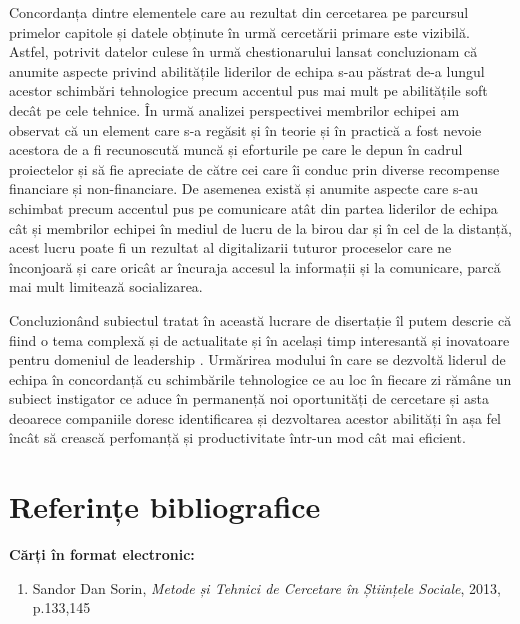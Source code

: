 \documentclass[a4paper, 12pt]{article}
\begin{document}
	\quad  Concordanța dintre elementele care au rezultat din cercetarea pe parcursul primelor capitole și datele obținute în urmă cercetării primare este vizibilă. Astfel, potrivit datelor culese în urmă chestionarului lansat concluzionam că anumite aspecte privind abilitățile liderilor de echipa s-au păstrat de-a lungul acestor schimbări tehnologice precum accentul pus mai mult pe abilitățile soft decât pe cele tehnice. În urmă analizei perspectivei membrilor echipei am observat că un element care s-a regăsit și în teorie și în practică a fost nevoie acestora de a fi recunoscută muncă și eforturile pe care le depun în cadrul proiectelor și să fie apreciate de către cei care îi conduc prin diverse recompense financiare și non-financiare. De asemenea există și anumite aspecte care s-au schimbat precum accentul pus pe comunicare atât din partea liderilor de echipa cât și membrilor echipei în mediul de lucru de la birou dar și în cel de la distanță, acest lucru poate fi un rezultat al digitalizarii tuturor proceselor care ne înconjoară și care oricât ar încuraja accesul la informații și la comunicare, parcă mai mult limitează socializarea.

	\quad Concluzionând subiectul tratat în această lucrare de disertație îl putem descrie că fiind o tema complexă și de actualitate și în același timp interesantă și inovatoare pentru domeniul de leadership . Urmărirea modului în care se dezvoltă liderul de echipa în concordanță cu schimbările tehnologice ce au loc în fiecare zi rămâne un subiect instigator ce aduce în permanență noi oportunități de cercetare și asta deoarece companiile doresc identificarea și dezvoltarea acestor abilități în așa fel încât să crească perfomanță și productivitate într-un mod cât mai eficient.
\newpage


	\section*{Referințe bibliografice}
	\space
	\bigskip
	\bigskip

	\textbf{Cărți în format electronic:}
	\begin{enumerate}[1.]
		
	\item Sandor Dan Sorin, \textit{Metode și Tehnici de Cercetare în Științele Sociale}, 2013, p.133,145
	
	\end{enumerate}
\end{document}
